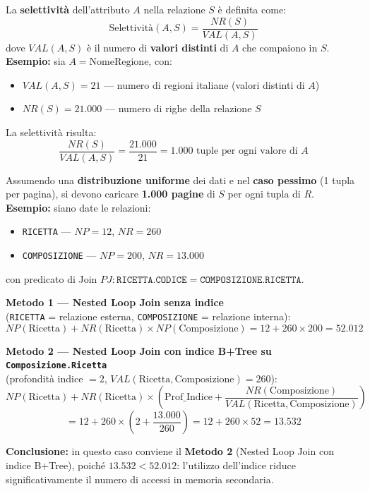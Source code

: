 \bigskip
\noindent La \textbf{selettività} dell'attributo $A$ nella relazione $S$ è definita come:
\[
\text{Selettività}(A, S) = \frac{NR(S)}{VAL(A,S)}
\]
dove $VAL(A,S)$ è il numero di \textbf{valori distinti} di $A$ che compaiono in $S$.
\bigskip
\noindent\textbf{Esempio:} sia $A = \text{NomeRegione}$, con:
\begin{itemize}
	\item $VAL(A,S) = 21$ — numero di regioni italiane (valori distinti di $A$)
	\item $NR(S) = 21.000$ — numero di righe della relazione $S$
\end{itemize}

\noindent La selettività risulta:
\[
\frac{NR(S)}{VAL(A,S)} = \frac{21.000}{21} = 1.000 \text{ tuple per ogni valore di } A
\]

\noindent Assumendo una \textbf{distribuzione uniforme} dei dati e nel \textbf{caso pessimo} (1 tupla per pagina), si devono caricare \textbf{1.000 pagine} di $S$ per ogni tupla di $R$.
\bigskip
\noindent\textbf{Esempio:} siano date le relazioni:
\begin{itemize}
	\item \texttt{RICETTA} — $NP = 12$, $NR = 260$
	\item \texttt{COMPOSIZIONE} — $NP = 200$, $NR = 13.000$
\end{itemize}

\noindent con predicato di Join $PJ: \texttt{RICETTA.CODICE} = \texttt{COMPOSIZIONE.RICETTA}$.

\bigskip
\noindent\textbf{Metodo 1 — Nested Loop Join senza indice}\\
(\texttt{RICETTA} = relazione esterna, \texttt{COMPOSIZIONE} = relazione interna):
\[
NP(\text{Ricetta}) + NR(\text{Ricetta}) \times NP(\text{Composizione})
= 12 + 260 \times 200 = \mathbf{52.012}
\]

\bigskip
\noindent\textbf{Metodo 2 — Nested Loop Join con indice B+Tree su \texttt{Composizione.Ricetta}}\\
(profondità indice $= 2$, $VAL(\text{Ricetta}, \text{Composizione}) = 260$):
\[
NP(\text{Ricetta}) + NR(\text{Ricetta}) \times \left(\text{Prof\_Indice} +
\frac{NR(\text{Composizione})}{VAL(\text{Ricetta},\text{Composizione})}\right)
\]
\[
= 12 + 260 \times \left(2 + \frac{13.000}{260}\right)
= 12 + 260 \times 52 = \mathbf{13.532}
\]

\bigskip
\noindent\textbf{Conclusione:} in questo caso conviene il \textbf{Metodo 2} (Nested Loop Join con indice B+Tree), poiché $13.532 < 52.012$: l'utilizzo dell'indice riduce significativamente il numero di accessi in memoria secondaria.
